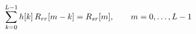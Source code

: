 \documentclass[preview]{standalone}
\begin{document}
\begin{align*}
\special{dvisvgm:raw <g id='unique000'>}\sum_{k=0}^{L-1}h[k]\,R_{rr}[m-k]=R_{sr}[m],\qquad m=0,\dots,L-1\special{dvisvgm:raw </g>}
\end{align*}
\end{document}
